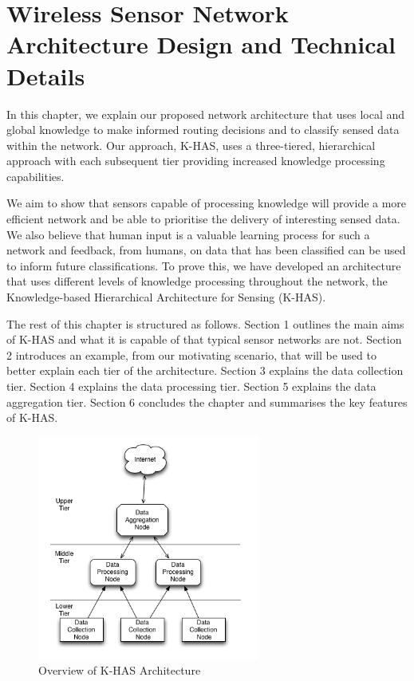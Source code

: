 \chapter{Wireless Sensor Network Architecture Design and Technical Details}\label{chap:arch}
	In this chapter, we explain our proposed network architecture that uses local and global knowledge to make informed routing decisions and to classify sensed data within the network. Our approach, K-HAS, uses a three-tiered, hierarchical approach with each subsequent tier providing increased knowledge processing capabilities. 

	We aim to show that sensors capable of processing knowledge will provide a more efficient network and be able to prioritise the delivery of interesting sensed data. We also believe that human input is a valuable learning process for such a network and feedback, from humans, on data that has been classified can be used to inform future classifications. To prove this, we have developed an architecture that uses different levels of knowledge processing throughout the network, the Knowledge-based Hierarchical Architecture for Sensing (K-HAS).

	The rest of this chapter is structured as follows. Section 1 outlines the main aims of K-HAS and what it is capable of that typical sensor networks are not. Section 2 introduces an example, from our motivating scenario, that will be used to better explain each tier of the architecture. Section 3 explains the data collection tier. Section 4 explains the data processing tier. Section 5 explains the data aggregation tier. Section 6 concludes the chapter and summarises the key features of K-HAS.

	\begin{figure}[h]
			\centering
			\includegraphics[width=0.65\textwidth]{Chap4/figures/khasarch}
			\caption{Overview of K-HAS Architecture}
			\label{arch:khas:arch}
			\end{figure}
	
